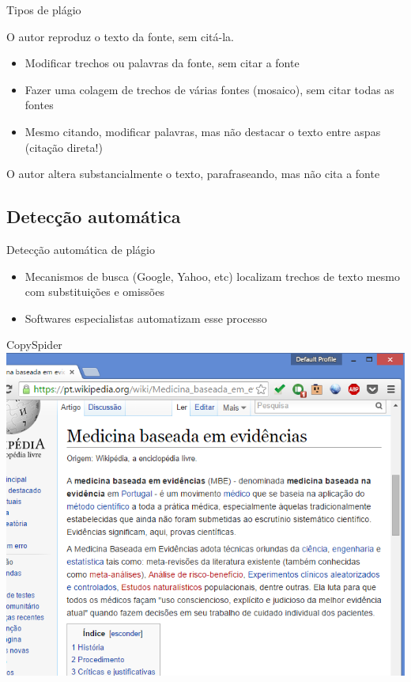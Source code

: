 \documentclass{beamer}
\begin{document}
\begin{frame}{Tipos de plágio}
  \begin{definition}
    O autor \alert{reproduz} o texto da fonte, sem citá-la.
  \end{definition}
  \begin{definition}
    \begin{itemize}
    \item Modificar trechos ou palavras da fonte, sem citar a fonte
    \item Fazer uma colagem de trechos de várias fontes (mosaico), sem
      citar \alert{todas} as fontes
    \item \alert{Mesmo citando}, modificar palavras, mas não destacar
      o texto entre aspas (citação direta!)
    \end{itemize}
  \end{definition}
  \begin{definition}
    O autor altera substancialmente o texto, parafraseando, mas não
    cita a fonte
  \end{definition}
\end{frame}

\subsection{Detecção automática}

\begin{frame}{Detecção automática de plágio}
  \begin{itemize}
  \item Mecanismos de busca (Google, Yahoo, etc) localizam trechos de
    texto mesmo com substituições e omissões
  \item Softwares especialistas automatizam esse processo
  \end{itemize}
\end{frame}

\begin{frame}{CopySpider}
  \includegraphics[height=.95\textheight]{Referencias/fonte}
\end{frame}
\end{document}
